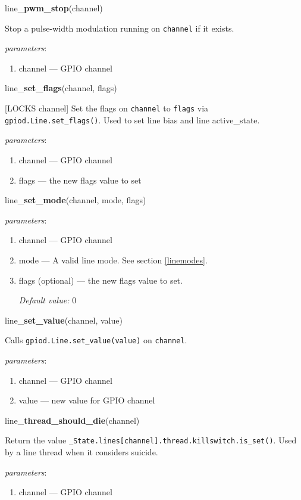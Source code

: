 \documentclass[12pt]{article}
\begin{document}
\noindent line\_\textbf{pwm\_stop}(channel)

Stop a pulse-width modulation running on \texttt{channel} if it exists.

\textit{parameters}:
\begin{enumerate}      
        \item channel --- GPIO channel
\end{enumerate}

\noindent line\_\textbf{set\_flags}(channel, flags)

[LOCKS channel]
Set the flags on \texttt{channel} to \texttt{flags} via \texttt{gpiod.Line.set\_flags()}. Used to set line bias and line active\_state.

\textit{parameters}:
\begin{enumerate}      
        \item channel --- GPIO channel
        \item flags --- the new flags value to set
\end{enumerate}

\noindent line\_\textbf{set\_mode}(channel, mode, flags)

\textit{parameters}:
\begin{enumerate}      
        \item channel --- GPIO channel
        \item mode --- A valid line mode. See section \ref{linemodes}.
        \item flags (optional) --- the new flags value to set.
        
        \textit{Default value:} $0$
\end{enumerate}

\noindent line\_\textbf{set\_value}(channel, value)

Calls \texttt{gpiod.Line.set\_value(value)} on \texttt{channel}.

\textit{parameters}:
\begin{enumerate}      
        \item channel --- GPIO channel
        \item value --- new value for GPIO channel
\end{enumerate}

\noindent line\_\textbf{thread\_should\_die}(channel)

Return the value \texttt{\_State.lines[channel].thread.killswitch.is\_set()}. Used by a line thread when it considers suicide.

\textit{parameters}:
\begin{enumerate}      
        \item channel --- GPIO channel
\end{enumerate}
\end{document}
